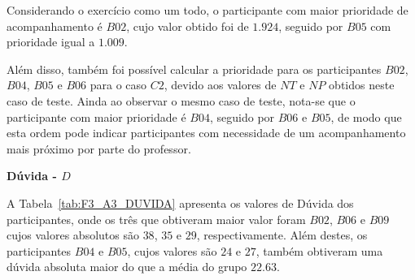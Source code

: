 Considerando o exercício como um todo, o participante com maior prioridade de acompanhamento é $B02$, cujo valor obtido foi de $1.924$, seguido por $B05$ com prioridade igual a $1.009$.

Além disso, também foi possível calcular a prioridade para os participantes $B02$, $B04$, $B05$ e $B06$ para o caso $C2$, devido aos valores de $NT$ e $NP$ obtidos neste caso de teste. Ainda ao observar o mesmo caso de teste, nota-se que o participante com maior prioridade é $B04$, seguido por $B06$ e $B05$, de modo que esta ordem pode indicar participantes com necessidade de um acompanhamento mais próximo por parte do professor.

\textbf{Dúvida - $D$}

A Tabela~\ref{tab:F3_A3_DUVIDA} apresenta os valores de Dúvida dos participantes, onde os três que obtiveram maior valor foram $B02$, $B06$ e $B09$ cujos valores absolutos são $38$, $35$ e $29$, respectivamente. Além destes, os participantes $B04$ e $B05$, cujos valores são $24$ e $27$, também obtiveram uma dúvida absoluta maior do que a média do grupo $22.63$.

